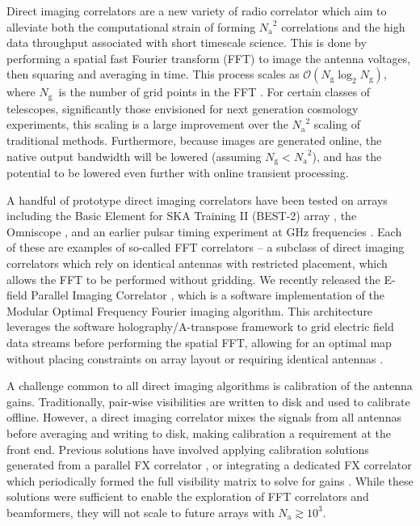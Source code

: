 \documentclass[a4paper,fleqn,usenatbib]{../mnras}
\newcommand{\Nant}{\ensuremath{N_{\mathrm{a}}}}
\newcommand{\Ng}{\ensuremath{N_{\mathrm{g}}}}
\begin{document}
Direct imaging correlators are a new variety of radio correlator which aim to alleviate both the computational strain of forming $\Nant^2$ correlations and the high data throughput associated with short timescale science. This is done by performing a spatial fast Fourier transform (FFT) to image the antenna voltages, then squaring and averaging in time. This process scales as $\mathcal{O}(\Ng \log_2 \Ng)$, where \Ng~is the number of grid points in the FFT \citep{mor11, teg09, teg10}. For certain classes of telescopes, significantly those envisioned for next generation cosmology experiments, this scaling is a large improvement over the $\Nant^2$ scaling of traditional methods. Furthermore, because images are generated online, the native output bandwidth will be lowered (assuming $\Ng < \Nant^2$), and has the potential to be lowered even further with online transient processing.

A handful of prototype direct imaging correlators have been tested on arrays including the Basic Element for SKA Training II (BEST-2) array \citep{fos14}, the Omniscope \citep{zhe14}, and an earlier pulsar timing experiment at GHz frequencies \citep{oto94, dai00}. Each of these are examples of so-called FFT correlators -- a subclass of direct imaging correlators which rely on identical antennas with restricted placement, which allows the FFT to be performed without gridding. We recently released the E-field Parallel Imaging Correlator \citep[EPIC;][]{thy15c}, which is a software implementation of the Modular Optimal Frequency Fourier \citep[MOFF;][]{mor11} imaging algorithm. This architecture leverages the software holography/A-transpose framework to grid electric field data streams before performing the spatial FFT, allowing for an optimal map without placing constraints on array layout or requiring identical antennas \citep{mor09,bha08,teg97a}.

A challenge common to all direct imaging algorithms is calibration of the antenna gains. Traditionally, pair-wise visibilities are written to disk and used to calibrate offline. However, a direct imaging correlator mixes the signals from all antennas before averaging and writing to disk, making calibration a requirement at the front end. Previous solutions have involved applying calibration solutions generated from a parallel FX correlator \citep{zhe14, fos14}, or integrating a dedicated FX correlator which periodically formed the full visibility matrix to solve for gains \citep{wij09,dev09}. While these solutions were sufficient to enable the exploration of FFT correlators and beamformers, they will not scale to future arrays with $\Nant \gtrsim 10^3$.
\end{document}
